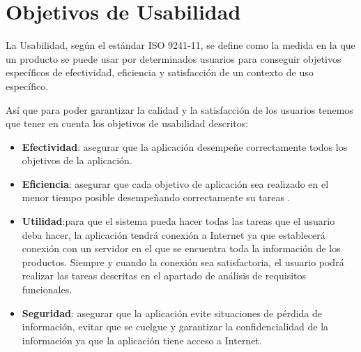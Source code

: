 \section{Objetivos de Usabilidad}

La Usabilidad, según el estándar ISO 9241-11, se define como la medida en la que un producto se puede usar por determinados usuarios para conseguir objetivos específicos de efectividad, eficiencia y satisfacción de un contexto de uso específico.  

Así que para poder garantizar la calidad y la satisfacción de los usuarios tenemos que tener en cuenta los objetivos de usabilidad descritos:  

\begin{itemize}
	\item {\bfseries Efectividad}: asegurar que la aplicación desempeñe correctamente todos los objetivos de la aplicación.  	
	\item {\bfseries Eficiencia}: asegurar que cada objetivo de aplicación sea realizado en el menor tiempo posible desempeñando correctamente su tareas .
	\item {\bfseries Utilidad}:para que el sistema pueda hacer todas las tareas que el usuario deba hacer, la aplicación tendrá conexión a Internet ya que establecerá conexión con un servidor en el que se encuentra toda la información de los productos. Siempre y cuando la conexión sea satisfactoria, el usuario podrá realizar las tareas descritas en el apartado de análisis de requisitos funcionales. 
	\item {\bfseries Seguridad}: asegurar que la aplicación evite situaciones de pérdida de información, evitar que se cuelgue y garantizar la confidencialidad de la información ya que la aplicación tiene acceso a Internet.
\end{itemize}	 

